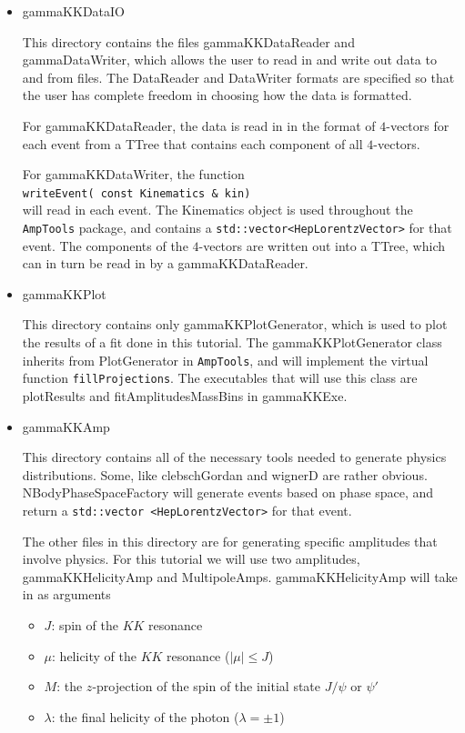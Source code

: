 \documentclass[11pt]{article}
\newcommand{\AmpTools}{{\tt{AmpTools}}}
\begin{document}
\begin{itemize}
\item gammaKKDataIO

This directory contains the files gammaKKDataReader and
gammaDataWriter, which allows the user to read in and write out data
to and from files. The DataReader and DataWriter formats are specified
so that the user has complete freedom in choosing how the data is
formatted.

For gammaKKDataReader, the data is read in in the format of
$4$-vectors for each event from a TTree that contains each
component of all $4$-vectors.

For gammaKKDataWriter, the function \\
{\tt{writeEvent( const Kinematics \& kin)}} \\
will read in each event. The Kinematics object is used throughout the
\AmpTools{} package, and contains a
         {\tt{std::vector<HepLorentzVector>}} for that event. The
         components of the $4$-vectors are written out into a TTree,
         which can in turn be read in by a gammaKKDataReader.

\item gammaKKPlot

This directory contains only gammaKKPlotGenerator, which is used to
plot the results of a fit done in this tutorial. The
gammaKKPlotGenerator class inherits from PlotGenerator in \AmpTools,
and will implement the virtual function {\tt{fillProjections}}. The
executables that will use this class are plotResults and
fitAmplitudesMassBins in gammaKKExe.

\item gammaKKAmp

This directory contains all of the necessary tools needed to generate
physics distributions. Some, like clebschGordan and wignerD are rather
obvious. NBodyPhaseSpaceFactory will generate events based on phase
space, and return a {\tt{std::vector <HepLorentzVector>}} for that
event.

The other files in this directory are for generating specific
amplitudes that involve physics. For this tutorial we will use two
amplitudes, gammaKKHelicityAmp and MultipoleAmps. gammaKKHelicityAmp
will take in as arguments
\begin{itemize}
\item $J$: spin of the $KK$ resonance
\item $\mu$: helicity of the $KK$ resonance ($|\mu| \leq J$)
\item $M$: the $z$-projection of the spin of the initial state
  $J/\psi$ or $\psi'$
\item $\lambda$: the final helicity of the photon ($\lambda = \pm 1$)
\end{itemize}


\end{itemize}
\end{document}
